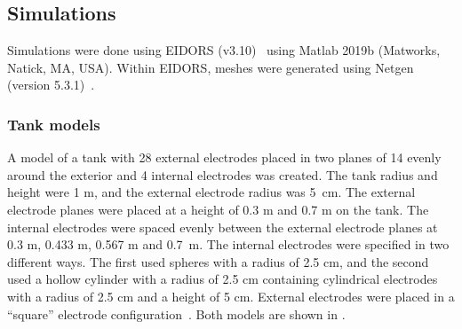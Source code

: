 \subsection{Simulations}
Simulations were done using EIDORS (v3.10)~\parencite{adler_eidors_2017}
using Matlab 2019b (Matworks, Natick, MA, USA).
Within EIDORS, meshes were generated using 
Netgen (version 5.3.1)~\parencite{schoberl_netgen_1997}.

\subsubsection{Tank models}
A model of a tank with 28 external electrodes placed in two planes of 14
evenly around the exterior
and 4 internal electrodes was created. 
The tank radius and height were 1 m, and the external electrode radius was 5 cm. 
The external electrode planes were placed at a height of 0.3 m and 0.7 m on the tank. 
The internal electrodes were spaced evenly between the external electrode planes 
at 0.3 m, 0.433 m, 0.567 m and 0.7 m. The internal electrodes were specified in 
two different ways. The first used spheres with a radius of 2.5 cm, and the second 
used a hollow cylinder with a radius of 2.5 cm containing cylindrical electrodes
with a radius of 2.5 cm and a height of 5 cm. External electrodes were
placed in a ``square'' electrode configuration~\parencite{grychtol_3d_2016}. 
Both models are shown in .


